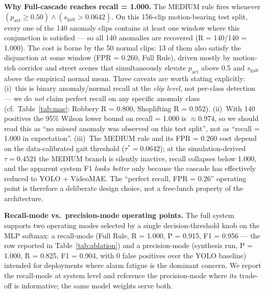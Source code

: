 \documentclass[runningheads]{llncs}
\begin{document}
\begin{algorithm}[!htbp]
\textbf{Why Full-cascade reaches recall = 1.000.} The MEDIUM rule fires whenever $(p_\text{act} \geq 0.50) \wedge (s_\text{gait} > 0.0642)$. On this 156-clip motion-bearing test split, every one of the 140 anomaly clips contains at least one window where this conjunction is satisfied --- so all 140 anomalies are recovered (R = 140/140 = 1.000). The cost is borne by the 50 normal clips: 13 of them also satisfy the disjunction at some window (FPR = 0.260, Full Rule), driven mostly by motion-rich corridor and street scenes that simultaneously elevate $p_\text{act}$ above 0.5 and $s_\text{gait}$ above the empirical normal mean. Three caveats are worth stating explicitly: (i)~this is binary anomaly/normal recall at the \emph{clip level}, not per-class detection --- we do \emph{not} claim perfect recall on any specific anomaly class (cf.\ Table~\ref{tab:mae}: Robbery R = 0.800, Shoplifting R = 0.952). (ii)~With 140 positives the 95\% Wilson lower bound on recall = 1.000 is $\approx 0.974$, so we should read this as ``no missed anomaly was observed on this test split'', not as ``recall = 1.000 in expectation''. (iii)~The MEDIUM rule and its FPR = 0.260 cost depend on the data-calibrated gait threshold ($\tau^*=0.0642$); at the simulation-derived $\tau=0.4521$ the MEDIUM branch is silently inactive, recall collapses below 1.000, and the apparent system F1 \emph{looks better} only because the cascade has effectively reduced to YOLO + VideoMAE. The ``perfect recall, FPR = 0.26'' operating point is therefore a deliberate design choice, not a free-lunch property of the architecture.

\textbf{Recall-mode vs.\ precision-mode operating points.} The full system supports two operating modes selected by a single decision-threshold knob on the MLP softmax: a recall-mode (Full Rule, R = 1.000, P = 0.915, F1 = 0.956 --- the row reported in Table~\ref{tab:ablation}) and a precision-mode (synthesis run, P = 1.000, R = 0.825, F1 = 0.904, with 0 false positives over the YOLO baseline) intended for deployments where alarm fatigue is the dominant concern. We report the recall-mode at system level and reference the precision-mode where its trade-off is informative; the same model weights serve both.


\end{algorithm}
\end{document}
